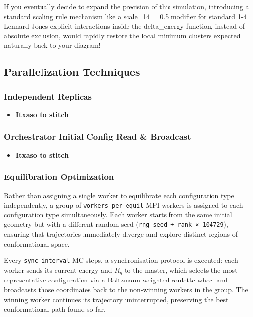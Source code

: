 \documentclass[
]{article}
\providecommand{\tightlist}{%
  \setlength{\itemsep}{0pt}\setlength{\parskip}{0pt}}
\begin{document}
\begin{enumerate}
  If you eventually decide to expand the precision of this simulation,
  introducing a standard scaling rule mechanism like a scale\_14 = 0.5
  modifier for standard 1-4 Lennard-Jones explicit interactions inside
  the delta\_energy function, instead of absolute exclusion, would
  rapidly restore the local minimum clusters expected naturally back to
  your diagram!
\end{enumerate}

\subsection{Parallelization
Techniques}\label{parallelization-techniques}

\subsubsection{Independent Replicas}\label{independent-replicas}

\begin{itemize}
\tightlist
\item
  \textbf{Itxaso to stitch}
\end{itemize}

\subsubsection{Orchestrator Initial Config Read \&
Broadcast}\label{orchestrator-initial-config-read-broadcast}

\begin{itemize}
\tightlist
\item
  \textbf{Itxaso to stitch}
\end{itemize}

\subsubsection{Equilibration
Optimization}\label{equilibration-optimization}

Rather than assigning a single worker to equilibrate each configuration
type independently, a group of \texttt{workers\_per\_equil} MPI workers
is assigned to each configuration type simultaneously. Each worker
starts from the same initial geometry but with a different random seed
(\texttt{rng\_seed\ +\ rank\ ×\ 104729}), ensuring that trajectories
immediately diverge and explore distinct regions of conformational
space.

Every \texttt{sync\_interval} MC steps, a synchronisation protocol is
executed: each worker sends its current energy and \(R_g\) to the
master, which selects the most representative configuration via a
Boltzmann-weighted roulette wheel and broadcasts those coordinates back
to the non-winning workers in the group. The winning worker continues
its trajectory uninterrupted, preserving the best conformational path
found so far.
\end{document}
